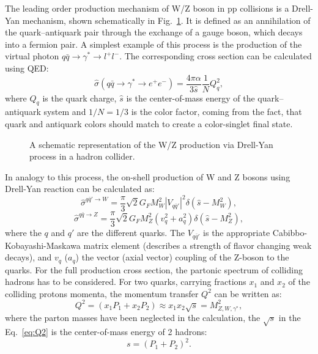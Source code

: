 The leading order production mechanism of W/Z boson in pp collisions is a Drell-Yan mechanism, shown schematically in Fig.~\ref{fig:DY}. It is defined as an annihilation of the quark--antiquark pair through the exchange of a gauge boson, which decays into a fermion pair. A simplest example of this process is the production of the virtual photon $q\bar{q} \to \gamma^{*} \to l^+ l^-$. The corresponding cross section can be calculated using QED:
\begin{equation}
\hat{\sigma}(q\bar{q} \to \gamma^{*} \to e^+ e^-) = \frac{4\pi\alpha}{3\hat{s}}\frac{1}{N}Q^2_q,
\end{equation}
where $Q_q$ is the quark charge, $\hat{s}$ is the center-of-mass energy of the quark--antiquark system and $1/N=1/3$ is the color factor, coming from the fact, that quark and antiquark colors should match to create a color-singlet final state.

\begin{figure}[!tbp]
\caption{A schematic representation of the W/Z production via Drell-Yan process in a hadron collider.}
\label{fig:DY}
\end{figure}

In analogy to this process, the on-shell production of W and Z bosons using Drell-Yan reaction can be calculated as:
\begin{equation}
\hat{\sigma}^{q\bar{q}' \to W} = \frac{\pi}{3}\sqrt{2}G_F M^2_W | V_{q\bar{q}'}|^2 \delta (\hat{s}-M^2_{W}),
\end{equation}
\begin{equation}
\hat{\sigma}^{q\bar{q} \to Z} = \frac{\pi}{3}\sqrt{2}G_F M^2_Z (v^2_q+a^2_q) \delta (\hat{s}-M^2_{Z}),
\end{equation}
where the $q$ and $q'$ are the different quarks. The $V_{q\bar{q}'}$ is the appropriate Cabibbo-Kobayashi-Maskawa matrix element (describes a strength of flavor changing weak decays), and $v_q$ ($a_q$) the vector (axial vector) coupling of the Z-boson to the quarks. For the full production cross section, the partonic spectrum of colliding hadrons has to be considered. For two quarks, carrying fractions $x_1$ and $x_2$ of the colliding protons momenta, the momentum transfer $Q^2$ can be written as:
\begin{equation}\label{eq:Q2}
Q^2 = (x_1P_1 + x_2P_2) \approx x_1 x_2 \sqrt{s} = M^2_{Z,W,\gamma^{*}},
\end{equation}
where the parton masses have been neglected in the calculation,  the $\sqrt{s}$ in the Eq.~\ref{eq:Q2} is the center-of-mass energy of 2 hadrons:
\begin{equation}
s=(P_1+P_2)^2.
\end{equation}


